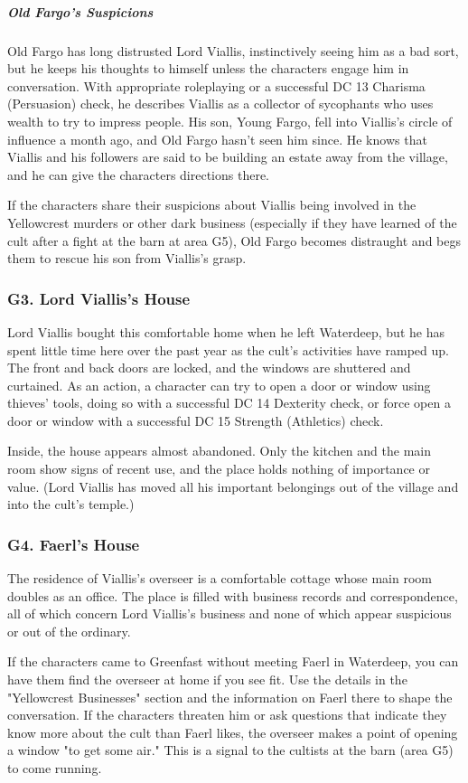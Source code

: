 \documentclass[10pt,a4paper,twoside,bg=print,twocolumn,openany,nodeprecatedcode]{dndbook}
\begin{document}
\subparagraph{Old Fargo's Suspicions}
Old Fargo has long distrusted Lord Viallis, instinctively seeing him as a bad sort, but he keeps his thoughts to himself unless the characters engage him in conversation. With appropriate roleplaying or a successful DC 13 Charisma (Persuasion) check, he describes Viallis as a collector of sycophants who uses wealth to try to impress people. His son, Young Fargo, fell into Viallis's circle of influence a month ago, and Old Fargo hasn't seen him since. He knows that Viallis and his followers are said to be building an estate away from the village, and he can give the characters directions there.

If the characters share their suspicions about Viallis being involved in the Yellowcrest murders or other dark business (especially if they have learned of the cult after a fight at the barn at area G5), Old Fargo becomes distraught and begs them to rescue his son from Viallis's grasp.

\subsubsection{G3. Lord Viallis's House}
Lord Viallis bought this comfortable home when he left Waterdeep, but he has spent little time here over the past year as the cult's activities have ramped up. The front and back doors are locked, and the windows are shuttered and curtained. As an action, a character can try to open a door or window using thieves' tools, doing so with a successful DC 14 Dexterity check, or force open a door or window with a successful DC 15 Strength (Athletics) check.

Inside, the house appears almost abandoned. Only the kitchen and the main room show signs of recent use, and the place holds nothing of importance or value. (Lord Viallis has moved all his important belongings out of the village and into the cult's temple.)

\subsubsection{G4. Faerl's House}
The residence of Viallis's overseer is a comfortable cottage whose main room doubles as an office. The place is filled with business records and correspondence, all of which concern Lord Viallis's business and none of which appear suspicious or out of the ordinary.

If the characters came to Greenfast without meeting Faerl in Waterdeep, you can have them find the overseer at home if you see fit. Use the details in the "Yellowcrest Businesses" section and the information on Faerl there to shape the conversation. If the characters threaten him or ask questions that indicate they know more about the cult than Faerl likes, the overseer makes a point of opening a window "to get some air." This is a signal to the cultists at the barn (area G5) to come running.
\end{document}
